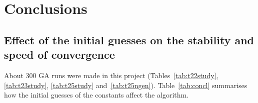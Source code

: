 \section{Conclusions}
\label{sec:conclusions}

\subsection{Effect of the initial guesses on the stability and speed of convergence}
About 300 GA runs were made in this project (Tables~\ref{tab:t22study}, \ref{tab:t23study},
\ref{tab:t25study} and~\ref{tab:t25ngen}). Table~\ref{tab:concl} summarises how the initial guesses
of the constants affect the algorithm.

